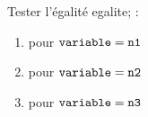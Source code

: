 \documentclass[exercice]{thedocument}%
\begin{document}
%
\smallskip\par\noindent Tester l'égalité \<egalite; :
\begin{enumerate}
    \item pour $\<variable;=\<n1;$
    \item pour $\<variable;=\<n2;$
    \item pour $\<variable;=\<n3;$
\end{enumerate}
\end{document}
